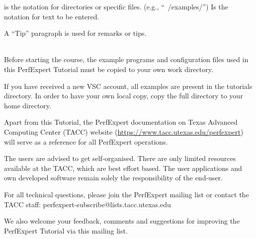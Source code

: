 \begin{prompt}
\end{prompt}

 is the notation for directories or specific files. (e.g., ``~/examples/'')
 Is the notation for text to be entered.

\begin{tip}
A ``Tip'' paragraph is used for remarks or tips.
\end{tip}

 \\

Before starting the course, the example programs and configuration files used in this PerfExpert Tutorial must be copied to your own work directory.


If you have received a new VSC account, all examples are present in the tutorials directory. In order to have your own local copy, copy the full directory to your home directory.


\begin{prompt}
\end{prompt}

Apart from this Tutorial, the PerfExpert documentation on Texas Advanced Computing Center (TACC) website (\url{https://www.tacc.utexas.edu/perfexpert}) will serve as a reference for all PerfExpert operations.

\begin{tip}
The users are advised to get self-organised. There are only limited resources available at the TACC, which are best effort based. The user applications and own developed software remain solely the responsibility of the end-user.
\end{tip}



For all technical questions, please join the PerfExpert mailing list or contact the TACC staff: perfexpert-subscribe@lists.tacc.utexas.edu

We also welcome your feedback, comments and suggestions for improving the PerfExpert Tutorial via this mailing list.
